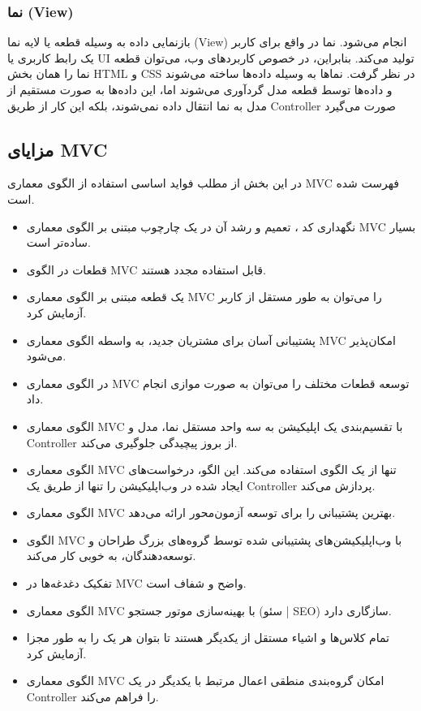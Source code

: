 \subsubsection{نما (View)}
بازنمایی داده به وسیله قطعه یا لایه نما (View) انجام می‌شود. نما در واقع برای کاربر یک رابط کاربری یا UI تولید می‌کند. بنابراین، در خصوص کاربردهای وب، می‌توان قطعه نما را همان بخش HTML و CSS در نظر گرفت. نماها به وسیله داده‌ها ساخته می‌شوند و داده‌ها توسط قطعه مدل گردآوری می‌شوند اما، این داده‌ها به صورت مستقیم از مدل به نما انتقال داده نمی‌شوند، بلکه این کار از طریق Controller صورت می‌گیرد

\subsection{مزایای MVC}
در این بخش از مطلب فواید اساسی استفاده از الگوی معماری MVC فهرست شده است.
\begin{itemize}
	\item
	نگهداری کد
	، تعمیم و رشد آن در یک چارچوب مبتنی بر الگوی معماری MVC بسیار ساده‌تر است.
	\item
	قطعات در الگوی MVC‌ قابل استفاده مجدد هستند.
	\item
	یک قطعه مبتنی بر الگوی معماری MVC‌ را می‌توان به طور مستقل از کاربر آزمایش کرد.
	\item
	پشتیبانی آسان برای مشتریان جدید، به واسطه الگوی معماری MVC امکان‌پذیر می‌شود.
	\item
	در الگوی معماری MVC توسعه قطعات مختلف را می‌توان به صورت موازی انجام داد.
	\item
	الگوی معماری MVC با تقسیم‌بندی یک اپلیکیشن به سه واحد مستقل نما، مدل و Controller از بروز پیچیدگی جلوگیری می‌کند.
	\item
	الگوی معماری MVC تنها از یک الگوی
	 استفاده می‌کند. این الگو، درخواست‌های ایجاد شده در وب‌اپلیکیشن را تنها از طریق یک Controller پردازش می‌کند.
	\item
	الگوی معماری MVC بهترین پشتیبانی را برای توسعه آزمون‌محور
	 ارائه می‌دهد.
	\item
	الگوی MVC با وب‌اپلیکیشن‌های پشتیبانی شده توسط گروه‌های بزرگ طراحان و توسعه‌دهندگان، به خوبی کار می‌کند.
	\item
	تفکیک دغدغه‌ها
	 در MVC واضح و شفاف است.
	\item
	الگوی معماری MVC با بهینه‌سازی موتور جستجو (سئو | SEO) سازگاری دارد.
	\item
	تمام کلاس‌ها و اشیاء مستقل از یکدیگر هستند تا بتوان هر یک را به طور مجزا آزمایش کرد.
	\item
	الگوی معماری MVC امکان گروه‌بندی منطقی اعمال مرتبط با یکدیگر در یک Controller را فراهم می‌کند.
\end{itemize}

